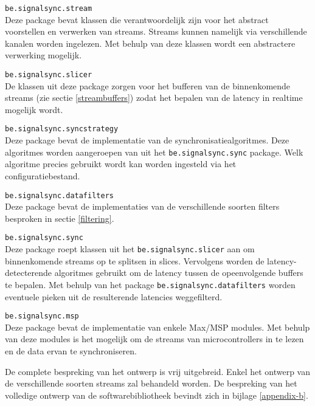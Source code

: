 \begin{description}	
	\item\texttt{be.signalsync.stream} \hfill \\
	Deze package bevat klassen die verantwoordelijk zijn voor het abstract voorstellen en verwerken van streams. Streams kunnen namelijk via verschillende kanalen worden ingelezen. Met behulp van deze klassen wordt een abstractere verwerking mogelijk.
	
	\item\texttt{be.signalsync.slicer} \hfill \\
	De klassen uit deze package zorgen voor het bufferen van de binnenkomende streams (zie sectie \ref{streambuffers}) zodat het bepalen van de latency in realtime mogelijk wordt. 

	\item\texttt{be.signalsync.syncstrategy} \hfill \\
	Deze package bevat de implementatie van de synchronisatiealgoritmes. Deze algoritmes worden aangeroepen van uit het \texttt{be.signalsync.sync} package. Welk algoritme precies gebruikt wordt kan worden ingesteld via het configuratiebestand.
	
	\item\texttt{be.signalsync.datafilters} \hfill \\
	Deze package bevat de implementaties van de verschillende soorten filters besproken in sectie \ref{filtering}.
	
	\item\texttt{be.signalsync.sync} \hfill \\
	Deze package roept klassen uit het \texttt{be.signalsync.slicer} aan om binnenkomende streams op te splitsen in slices. Vervolgens worden de latency-detecterende algoritmes gebruikt om de latency tussen de opeenvolgende buffers te bepalen. Met behulp van het package \texttt{be.signalsync.datafilters} worden eventuele pieken uit de resulterende latencies weggefilterd. \\

	\item\texttt{be.signalsync.msp} \hfill \\
	Deze package bevat de implementatie van enkele Max/MSP modules. Met behulp van deze modules is het mogelijk om de streams van microcontrollers in te lezen en de data ervan te synchroniseren.
	
\end{description}

De complete bespreking van het ontwerp is vrij uitgebreid. Enkel het ontwerp van de verschillende soorten streams zal behandeld worden. De bespreking van het volledige ontwerp van de softwarebibliotheek bevindt zich in bijlage \ref{appendix-b}.

